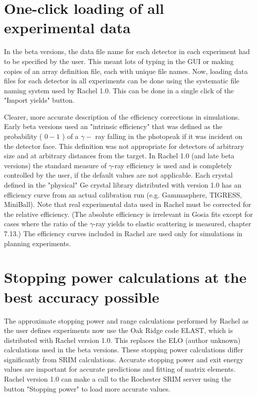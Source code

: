 \documentclass[10pt]{article}
\begin{document}
\section*{One-click loading of all experimental data}
In the beta versions, the data file name for each detector in each experiment had to be specified by the user. This meant lots of typing in the GUI or making copies of an array definition file, each with unique file names. Now, loading data files for each detector in all experiments can be done using the systematic file naming system used by Rachel 1.0. This can be done in a single click of the "Import yields" button.

Clearer, more accurate description of the efficiency corrections in simulations.\\
Early beta versions used an "intrinsic efficiency" that was defined as the probability ( $0-1$ ) of a $\gamma-$ ray falling in the photopeak if it was incident on the detector face. This definition was not appropriate for detectors of arbitrary size and at arbitrary distances from the target. In Rachel 1.0 (and late beta versions) the standard measure of $\gamma$-ray efficiency is used and is completely controlled by the user, if the default values are not applicable. Each crystal defined in the "physical" Ge crystal library distributed with version 1.0 has an efficiency curve from an actual calibration run (e.g. Gammasphere, TIGRESS, MiniBall). Note that real experimental data used in Rachel must be corrected for the relative efficiency. (The absolute efficiency is irrelevant in Gosia fits except for cases where the ratio of the $\gamma$-ray yields to elastic scattering is measured, chapter 7.13.) The efficiency curves included in Rachel are used only for simulations in planning experiments.

\section*{Stopping power calculations at the best accuracy possible}
The approximate stopping power and range calculations performed by Rachel as the user defines experiments now use the Oak Ridge code ELAST, which is distributed with Rachel version 1.0. This replaces the ELO (author unknown) calculations used in the beta versions. These stopping power calculations differ significantly from SRIM calculations. Accurate stopping power and exit energy values are important for accurate predictions and fitting of matrix elements. Rachel version 1.0 can make a call to the Rochester SRIM server using the button "Stopping power" to load more accurate values.
\end{document}
